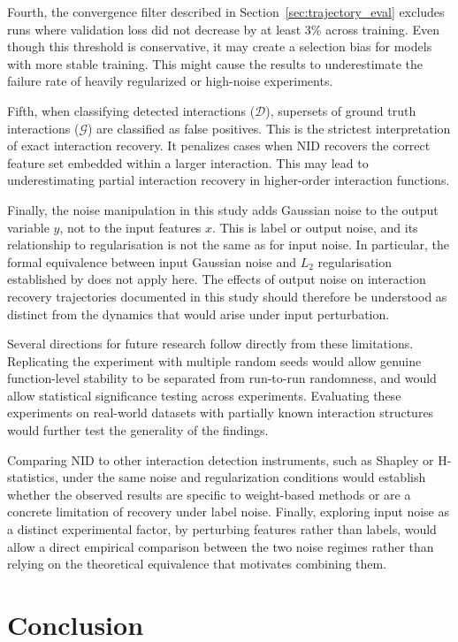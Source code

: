 \documentclass{article}
\begin{document}
Fourth, the convergence filter described in Section~\ref{sec:trajectory_eval} excludes runs where validation loss did not decrease by at least 3\% across training. Even though this threshold is conservative, it may create a selection bias for models with more stable training. This might cause the results to underestimate the failure rate of heavily regularized or high-noise experiments.

Fifth, when classifying detected interactions ($\mathcal{D}$), supersets of ground truth interactions ($\mathcal{G}$) are classified as false positives. This is the strictest interpretation of exact interaction recovery. It penalizes cases when NID recovers the correct feature set embedded within a larger interaction. This may lead to underestimating partial interaction recovery in higher-order interaction functions.

Finally, the noise manipulation in this study adds Gaussian noise to the output variable $y$, not to the input features $x$. This is label or output noise, and its relationship to regularisation is not the same as for input noise. In particular, the formal equivalence between input Gaussian noise and $L_2$ regularisation established by \cite{Goodfellow-et-al-2016} does not apply here. The effects of output noise on interaction recovery trajectories documented in this study should therefore be understood as distinct from the dynamics that would arise under input perturbation.

Several directions for future research follow directly from these limitations. Replicating the experiment with multiple random seeds would allow genuine function-level stability to be separated from run-to-run randomness, and would allow statistical significance testing across experiments. Evaluating these experiments on real-world datasets with partially known interaction structures would further test the generality of the findings.

Comparing NID to other interaction detection instruments, such as Shapley or H-statistics, under the same noise and regularization conditions would establish whether the observed results are specific to weight-based methods or are a concrete limitation of recovery under label noise. Finally, exploring input noise as a distinct experimental factor, by perturbing features rather than labels, would allow a direct empirical comparison between the two noise regimes rather than relying on the theoretical equivalence that motivates combining them.

\section{Conclusion}
\end{document}
